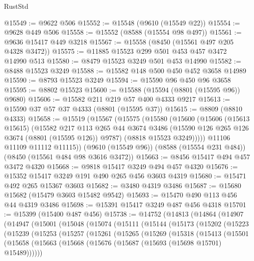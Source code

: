 \begin{lexlean}{RustStd}
\begin{coremodule}
@15549 := @9622 @506
@15552 := @15548 (@9610 (@15549 @22))
@15554 := @9628 @449 @506
@15558 := @15552 (@8588 (@15554 @98 @497))
@15561 := @9636 @15417 @449 @3218
@15567 := @15558 (@8450 (@15561 @497 @205 @4328 @3472))
@15575 := @11885 @15523 @299 @501 @453 @457 @3472 @14990 @513
@15580 := @8479 @15523 @3249 @501 @453 @14990
@15582 := @8488 @15523 @3249
@15588 := @15582 @148 @500 @450 @452 @3658 @14989
@15590 := @8793 @15523 @3249
@15594 := @15590 @96 @450 @96 @3658
@15595 := @8802 @15523
@15600 := @15588 (@15594 (@8801 (@15595 @96)) @9680)
@15606 := @15582 @211 @219 @57 @400 @4333 @9217
@15613 := @15590 @37 @57 @37 @4333 (@8801 (@15595 @37))
@15615 := @8809 (@8810 @4333)
@15658 := @15519
    (@15567
      (@15575
        (@15580
          (@15600
            (@15606
              (@15613 @15615)
              (@15582
                @217
                @113
                @265
                @44
                @3674
                @3486
                (@15590 @126 @265 @126 @3674 (@8801 (@15595 @126)) @9787)
                (@8818 @15523 @3249)))))
        @11106
        @11109
        @11112
        @11115))
    (@9610 (@15549 @96))
    (@8588 (@15554 @231 @484))
    (@8450 (@15561 @484 @98 @3616 @3472))
@15663 := @8456 @15417 @494 @457 @3472 @4320
@15668 := @9818 @15417 @3249 @494 @457 @4320
@15676 := @15352 @15417 @3249 @191 @490 @265 @456 @3603 @4319
@15680 := @15471 @492 @265 @15367 @3603
@15682 := @3480 @4319 @3486
@15687 := @15680 @15682 (@15479 @3603 @15482 @9542)
@15693 := @15470 @490 @113 @456 @44 @4319 @3486
@15698 := @15391 @15417 @3249 @487 @456 @4318
@15701 := @15399 (@15400 @487 @456)
@15738 := @14752
    (@14813
      (@14864
        (@14907
          (@14947
            (@15001
              (@15048
                (@15074
                  (@15111
                    (@15144
                      (@15173
                        (@15202
                          (@15223
                            (@15239
                              (@15253
                                (@15257
                                  (@15261
                                    (@15265
                                      (@15269
                                        (@15318
                                          (@15413
                                            (@15501
                                              (@15658
                                                (@15663
                                                  (@15668
                                                    (@15676
                                                      (@15687 (@15693 (@15698 @15701) @15489))))))

\end{coremodule}
\end{lexlean}
